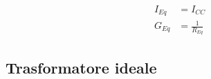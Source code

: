 \documentclass[10pt]{article}
\begin{document}
\begin{minipage}[t]{.7\textwidth}
\begin{minipage}[t]{.5\textwidth}
\begin{minipage}[t]{.3\textwidth}
                        

                    \end{minipage}
                    \hfill
                    \begin{minipage}[t]{.7\textwidth}

                        \begin{align*}
                            I_{Eq} &= I_{CC}\\
                            G_{Eq} &= \frac{1}{R_{Eq}}
                        \end{align*}

                    \end{minipage}

            \end{minipage}

    \end{minipage}

    \vspace{-2\baselineskip}
    \subsection*{Trasformatore ideale}
\end{document}
